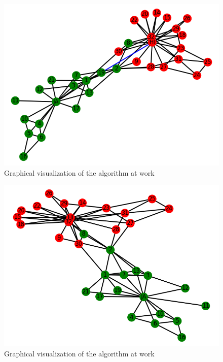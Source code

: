 \documentclass[11pt]{article}
\begin{document}
	\begin{figure}[h!]
		\includegraphics[scale=0.5]{resources/myplot14.png}
		\caption{Graphical visualization of the algorithm at work }
	\end{figure}
	\begin{figure}[h!]
		\includegraphics[scale=0.5]{resources/myplot13.png}
		\caption{Graphical visualization of the algorithm at work }
	\end{figure}
\end{document}
